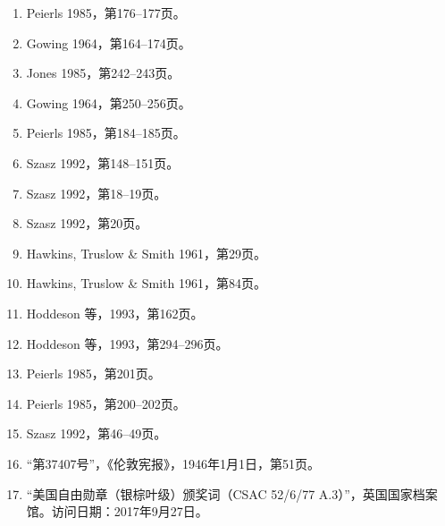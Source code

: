 \begin{enumerate}
\item Peierls 1985，第176–177页。
\item Gowing 1964，第164–174页。
\item Jones 1985，第242–243页。
\item Gowing 1964，第250–256页。
\item Peierls 1985，第184–185页。
\item Szasz 1992，第148–151页。
\item Szasz 1992，第18–19页。
\item Szasz 1992，第20页。
\item Hawkins, Truslow & Smith 1961，第29页。
\item Hawkins, Truslow & Smith 1961，第84页。
\item Hoddeson 等，1993，第162页。
\item Hoddeson 等，1993，第294–296页。
\item Peierls 1985，第201页。
\item Peierls 1985，第200–202页。
\item Szasz 1992，第46–49页。
\item “第37407号”，《伦敦宪报》，1946年1月1日，第51页。
\item “美国自由勋章（银棕叶级）颁奖词（CSAC 52/6/77 A.3）”，英国国家档案馆。访问日期：2017年9月27日。

\end{enumerate}
